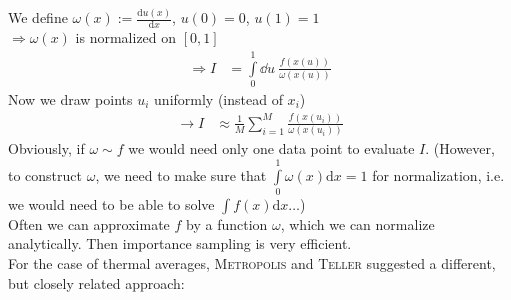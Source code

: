 We define $\omega(x) := \frac{\text{d}u(x)}{\text{d}x}$, $u(0)=0$, $u(1) = 1$\\
$\Rightarrow \omega(x)$ is normalized on $[0, 1]$
\begin{align}
	\Rightarrow I &= \int\limits_0^1\dd u\ \frac{f(x(u))}{\omega(x(u))}
\end{align}
Now we draw points $u_i$ uniformly (instead of $x_i$)
\begin{align}
	\rightarrow I &\approx \frac{1}{M}\sum\limits_{i=1}^M\frac{f(x(u_i))}{\omega(x(u_i))}
\end{align}
Obviously, if $\omega\sim f$ we would need only one data point to evaluate $I$. (However, to construct $\omega$, we need to make sure that $\int\limits_0^1\omega(x)\text{d}x = 1$ for normalization, i.e. we would need to be able to solve $\int f(x)\text{d}x\dots$)\\
Often we can approximate $f$ by a function $\omega$, which we can normalize analytically. Then importance sampling is very efficient.\\

For the case of thermal averages, \textsc{Metropolis} and \textsc{Teller} suggested a different, but closely related approach: